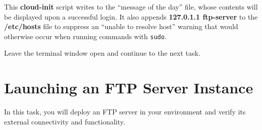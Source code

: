 \documentclass[letterpaper, 12pt]{article}
\begin{document}
\begin{enumerate}
    \begin{notebox}
        This \textbf{cloud-init} script writes to the ``message of the day'' file, whose contents will be displayed upon a successful login.
        It also appends \textbf{127.0.1.1 ftp-server} to the \textbf{/etc/hosts} file to suppress an ``unable to resolve host'' warning that would otherwise occur when running commands with \texttt{sudo}.
    \end{notebox}

    \begin{labstep}
        Leave the terminal window open and continue to the next task.
    \end{labstep}
\end{enumerate}

\section{Launching an FTP Server Instance}\label{sec:launching-an-ftp-server--instance}
In this task, you will deploy an FTP server in your environment and verify its external connectivity and functionality.
\end{document}
